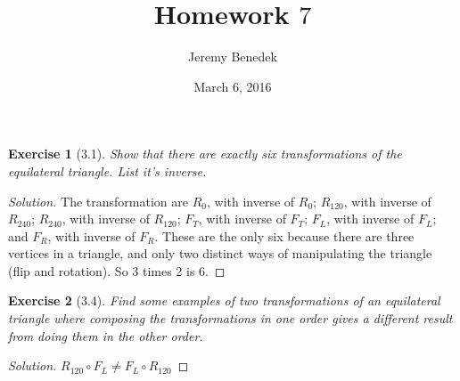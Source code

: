 \documentclass{article}
\title{Homework $7$}
\author{Jeremy Benedek}
\date{March 6, 2016}
\newtheorem*{ex}{Exercise}
\newenvironment{solution}
  {\begin{proof}[Solution]}
  {\renewcommand{\qedsymbol}{}\end{proof}}
\begin{document}
\maketitle

\begin{ex}[3.1]
	Show that there are exactly six transformations of the equilateral triangle. List it's inverse. 
\end{ex}
\begin{solution}
	The transformation are $R_0$, with inverse of $R_0$; $R_{120}$, with inverse of $R_{240}$; $R_{240}$, with inverse of $R_{120}$; $F_T$, with inverse of $F_T$; $F_L$, with inverse of $F_L$; and $F_R$, with inverse of $F_R$. 
	These are the only six because there are three vertices in a triangle, and only two distinct ways of manipulating the triangle (flip and rotation). So 3 times 2 is 6. 
\end{solution}

\begin{ex}[3.4]
	Find some examples of two transformations of an equilateral triangle where composing the transformations in one order gives a different result from doing them in the other order.
\end{ex}
\begin{solution}
  $R_{120} \circ F_L \neq F_L \circ R_{120}$
\end{solution}
\end{document}
